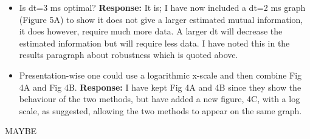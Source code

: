 \documentclass[12pt]{article}
\begin{document}
\begin{itemize}
\item Is dt=3 ms optimal? \textbf{Response:} It is; I have now included a dt=2 ms graph (Figure 5A) to show it
   does not give a larger estimated mutual information, it does
   however, require much more data. A larger dt will decrease the
   estimated information but will require less data. I have noted this
   in the results paragraph about robustness which is quoted above.
   
\item Presentation-wise one could use a logarithmic x-scale and then combine Fig 4A and Fig 4B.  \textbf{Response:} I have kept Fig 4A and 4B since they show the behaviour of the two
   methods, but have added a new figure, 4C, with a log scale, as
   suggested, allowing the two methods to appear on the same graph.

\end{itemize}

MAYBE
\end{document}
